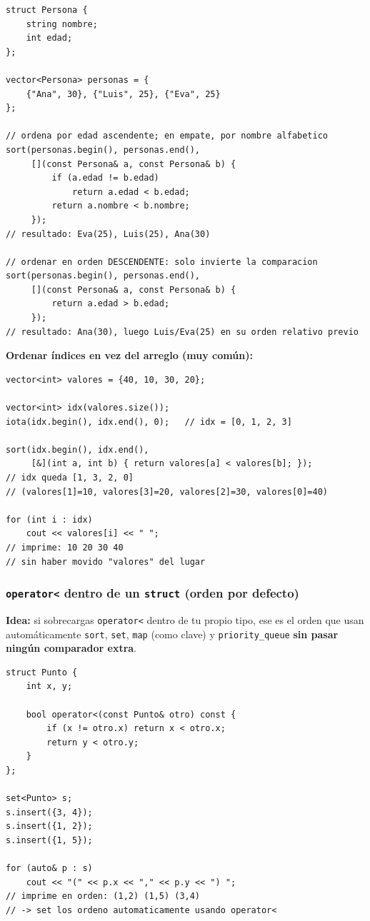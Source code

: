 \documentclass[10pt,a4paper,twocolumn]{article}
\begin{document}
\begin{lstlisting}[style=cpp]
struct Persona {
    string nombre;
    int edad;
};

vector<Persona> personas = {
    {"Ana", 30}, {"Luis", 25}, {"Eva", 25}
};

// ordena por edad ascendente; en empate, por nombre alfabetico
sort(personas.begin(), personas.end(),
     [](const Persona& a, const Persona& b) {
         if (a.edad != b.edad)
             return a.edad < b.edad;
         return a.nombre < b.nombre;
     });
// resultado: Eva(25), Luis(25), Ana(30)

// ordenar en orden DESCENDENTE: solo invierte la comparacion
sort(personas.begin(), personas.end(),
     [](const Persona& a, const Persona& b) {
         return a.edad > b.edad;
     });
// resultado: Ana(30), luego Luis/Eva(25) en su orden relativo previo
\end{lstlisting}

\textbf{Ordenar índices en vez del arreglo (muy común):}

\begin{lstlisting}[style=cpp]
vector<int> valores = {40, 10, 30, 20};

vector<int> idx(valores.size());
iota(idx.begin(), idx.end(), 0);   // idx = [0, 1, 2, 3]

sort(idx.begin(), idx.end(),
     [&](int a, int b) { return valores[a] < valores[b]; });
// idx queda [1, 3, 2, 0]
// (valores[1]=10, valores[3]=20, valores[2]=30, valores[0]=40)

for (int i : idx)
    cout << valores[i] << " ";
// imprime: 10 20 30 40
// sin haber movido "valores" del lugar
\end{lstlisting}


\subsubsection{\texttt{operator<} dentro de un \texttt{struct} (orden por defecto)}

\textbf{Idea:} si sobrecargas \texttt{operator<} dentro de tu propio
tipo, ese es el orden que usan automáticamente \texttt{sort},
\texttt{set}, \texttt{map} (como clave) y \texttt{priority\_queue}
\textbf{sin pasar ningún comparador extra}.

\begin{lstlisting}[style=cpp]
struct Punto {
    int x, y;

    bool operator<(const Punto& otro) const {
        if (x != otro.x) return x < otro.x;
        return y < otro.y;
    }
};

set<Punto> s;
s.insert({3, 4});
s.insert({1, 2});
s.insert({1, 5});

for (auto& p : s)
    cout << "(" << p.x << "," << p.y << ") ";
// imprime en orden: (1,2) (1,5) (3,4)
// -> set los ordeno automaticamente usando operator<
\end{lstlisting}
\end{document}
